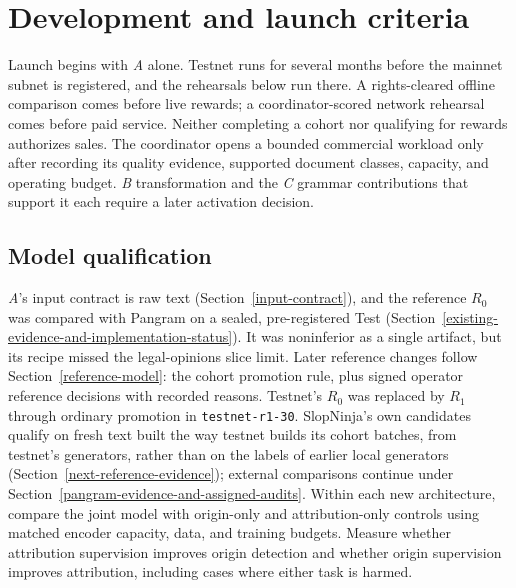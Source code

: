 \section{Development and launch
criteria}\label{development-and-launch-criteria}

Launch begins with \textit{A} alone. Testnet runs for several months before
the mainnet subnet is registered, and the rehearsals below run there. A
rights-cleared offline comparison comes
before live rewards; a coordinator-scored network rehearsal comes before paid
service. Neither completing a cohort nor qualifying for rewards authorizes
sales. The coordinator opens a bounded commercial workload only after recording
its quality evidence, supported document classes, capacity, and operating
budget. \textit{B} transformation and the \textit{C} grammar contributions that
support it each require a later activation decision.

\subsection{Model qualification}

\textit{A}'s input contract is raw text (Section~\ref{input-contract}), and the
reference \(R_0\) was compared with Pangram on a sealed, pre-registered
Test (Section~\ref{existing-evidence-and-implementation-status}). It was
noninferior as a single artifact, but its recipe missed the legal-opinions slice
limit. Later reference changes follow Section~\ref{reference-model}: the cohort
promotion rule, plus signed operator reference decisions with recorded reasons.
Testnet's \(R_0\) was replaced by \(R_1\) through ordinary promotion in
\texttt{testnet-r1-30}. SlopNinja's own candidates qualify on fresh text built the way
testnet builds its cohort batches, from testnet's generators, rather than on
the labels of earlier local generators (Section~\ref{next-reference-evidence});
external comparisons continue under
Section~\ref{pangram-evidence-and-assigned-audits}. Within each new architecture,
compare the joint model with origin-only and attribution-only controls using
matched encoder capacity, data, and training budgets. Measure whether
attribution supervision improves origin detection and whether origin supervision
improves attribution, including cases where either task is harmed.

